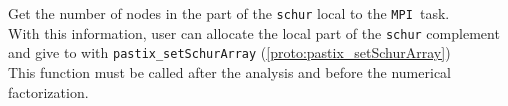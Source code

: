          {Get the number of nodes in the part of the \texttt{schur}
         local to the \texttt{MPI }task.\\
         With this information, user can allocate the local part of
         the \texttt{schur} complement and give to \pastix{}
         with \texttt{pastix\_setSchurArray}
         (\ref{proto:pastix_setSchurArray})\\
         This function must be called after the analysis and before
         the numerical factorization.}

